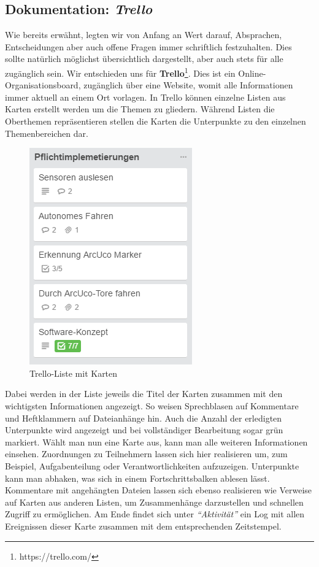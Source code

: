 \subsection{Dokumentation: \textit{Trello}}
Wie bereits erwähnt, legten wir von Anfang an Wert darauf, Absprachen, Entscheidungen aber auch offene Fragen immer schriftlich festzuhalten. Dies sollte natürlich möglichst übersichtlich dargestellt, aber auch stets für alle zugänglich sein. Wir entschieden uns für \textbf{Trello}\footnote[1]{https://trello.com/}. Dies ist ein Online-Organisationsboard, zugänglich über eine Website, womit alle Informationen immer aktuell an einem Ort vorlagen. In Trello können einzelne Listen aus Karten erstellt werden um die Themen zu gliedern. Während Listen die Oberthemen repräsentieren stellen die Karten die Unterpunkte zu den einzelnen Themenbereichen dar.
\begin{figure}[hp] 
  \centering
     \includegraphics{images/PflichtimplementierungenListe.PNG}
  \caption{Trello-Liste mit Karten}
  \label{fig:Trello-Liste}
\end{figure}
\newline
Dabei werden in der Liste jeweils die Titel der Karten zusammen mit den wichtigsten Informationen angezeigt. So weisen Sprechblasen auf Kommentare und Heftklammern auf Dateianhänge hin. Auch die Anzahl der erledigten Unterpunkte wird angezeigt und bei vollständiger Bearbeitung sogar grün markiert.
\pagebreak \newline
Wählt man nun eine Karte aus, kann man alle weiteren Informationen einsehen. Zuordnungen zu Teilnehmern lassen sich hier realisieren um, zum Beispiel, Aufgabenteilung oder Verantwortlichkeiten aufzuzeigen. Unterpunkte kann man abhaken, was sich in einem Fortschrittsbalken ablesen lässt. Kommentare mit angehängten Dateien lassen sich ebenso realisieren wie Verweise auf Karten aus anderen Listen, um Zusammenhänge darzustellen und schnellen Zugriff zu ermöglichen. Am Ende findet sich unter \textit{"`Aktivität"'} ein Log mit allen Ereignissen dieser Karte zusammen mit dem entsprechenden Zeitstempel.

